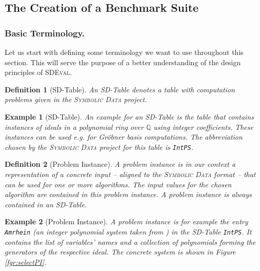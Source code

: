 \documentclass[oribibl,11pt]{article}
\newtheorem{example}{Example}
\newtheorem{definition}{Definition}
\begin{document}
\subsection{The Creation of a Benchmark Suite}
\subsubsection{Basic Terminology.}

Let us start with defining some terminology we want to use throughout
this section. This will serve the purpose of a better understanding of
the design principles of \textsc{SDEval}.

\vspace*{-10pt}
\begin{definition}[SD-Table]
\label{def:SD-Table}
 An SD-Table denotes a table with
computation problems given in the \textsc{Symbolic Data} project.
\end{definition}
\vspace*{-10pt}
\begin{example}[SD-Table]
An example for an SD-Table is the table that contains instances of
ideals in a polynomial ring over $\mathbb{Q}$ using integer
coefficients. These instances can be used e.g. for Gr\"obner basis
computations. The abbreviation chosen by the \textsc{Symbolic Data}
project for this table is \texttt{IntPS}.
\end{example}
\vspace*{-10pt}
\begin{definition}[Problem Instance]
\label{def:ProblemInstance}
 A problem instance is in our context a
representation of a concrete input -- aligned to the \textsc{Symbolic
  Data} format -- that can be used for one or more algorithms. The
input values for the chosen algorithm are contained in this problem
instance. A problem instance is always contained in an SD-Table.
\end{definition}
\vspace*{-10pt}
\begin{example}[Problem Instance]
  A problem instance is for example the entry \texttt{Amrhein} (an
  integer polynomial system taken from \cite{amrhein1996walking}) in
  the SD-Table \texttt{IntPS}. It contains the list of variables' names and a collection of
  polynomials forming the generators of the respective ideal. The
  concrete system is shown in Figure \ref{fgr:selectPI}.
\end{example}
\end{document}
